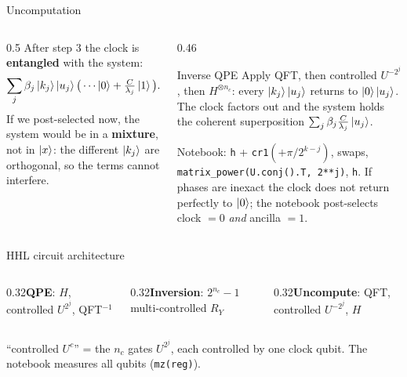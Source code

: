 \documentclass[aspectratio=169,11pt]{beamer}
\newcommand{\hl}[1]{{\color{qorange}\textbf{#1}}}
\newcommand{\key}[1]{{\color{qdark}\textbf{#1}}}
\begin{document}
\begin{frame}{Uncomputation}
  \begin{columns}[T]
    \begin{column}{0.5\textwidth}
      After step 3 the clock is \key{entangled} with the system:
      \[ \sum_j\beta_j\ket{k_j}\ket{u_j}\big(\cdots\ket0 + \tfrac{C}{\lambda_j}\ket1\big). \]
      If we post-selected now, the system would be in a \hl{mixture}, not in $\ket x$: the different $\ket{k_j}$ are orthogonal,
      so the terms cannot interfere.
    \end{column}
    \begin{column}{0.46\textwidth}
      \begin{block}{Inverse QPE}
        Apply QFT, then controlled $U^{-2^j}$, then $H^{\otimes n_c}$: every $\ket{k_j}\ket{u_j}$ returns to $\ket0\ket{u_j}$.
        The clock factors out and the system holds the coherent superposition $\sum_j\beta_j\frac{C}{\lambda_j}\ket{u_j}$.
      \end{block}
      \small Notebook: \texttt{h} + \texttt{cr1}$(+\pi/2^{k-j})$, swaps, \texttt{matrix\_power(U.conj().T, 2**j)}, \texttt{h}.
      If phases are inexact the clock does not return perfectly to $\ket0$; the notebook post-selects clock $= 0$ \emph{and} ancilla $= 1$.
    \end{column}
  \end{columns}
\end{frame}

\begin{frame}{HHL circuit architecture}
  \centering
  \\[3mm]
  \begin{columns}[T]
    \begin{column}{0.32\textwidth}\centering\small \key{QPE}: $H$, controlled $U^{2^j}$, QFT$^{-1}$\end{column}
    \begin{column}{0.32\textwidth}\centering\small \key{Inversion}: $2^{n_c} - 1$ multi-controlled $R_Y$\end{column}
    \begin{column}{0.32\textwidth}\centering\small \key{Uncompute}: QFT, controlled $U^{-2^j}$, $H$\end{column}
  \end{columns}
  \vspace{2mm}
  \small ``controlled $U^c$'' = the $n_c$ gates $U^{2^j}$, each controlled by one clock qubit. The notebook measures all qubits (\texttt{mz(reg)}).
\end{frame}
\end{document}
